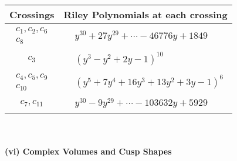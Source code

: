 \documentclass[1p]{elsarticle_modified}
\theoremstyle{definition}
\begin{document}
\begin{tabular}{m{50pt}|m{274pt}}
Crossings & \hspace{64pt}Riley Polynomials at each crossing \\
\hline $$\begin{aligned}c_{1},c_{2},c_{6}\\c_{8}\end{aligned}$$&$\begin{aligned}
&y^{30}+27 y^{29}+\cdots-46776 y+1849
\end{aligned}$\\
\hline $$\begin{aligned}c_{3}\end{aligned}$$&$\begin{aligned}
&(y^3- y^2+2 y-1)^{10}
\end{aligned}$\\
\hline $$\begin{aligned}c_{4},c_{5},c_{9}\\c_{10}\end{aligned}$$&$\begin{aligned}
&(y^5+7 y^4+16 y^3+13 y^2+3 y-1)^6
\end{aligned}$\\
\hline $$\begin{aligned}c_{7},c_{11}\end{aligned}$$&$\begin{aligned}
&y^{30}-9 y^{29}+\cdots-103632 y+5929
\end{aligned}$\\
\hline
\end{tabular}\\~\\
\newpage\flushleft \textbf{(vi) Complex Volumes and Cusp Shapes}
\end{document}
